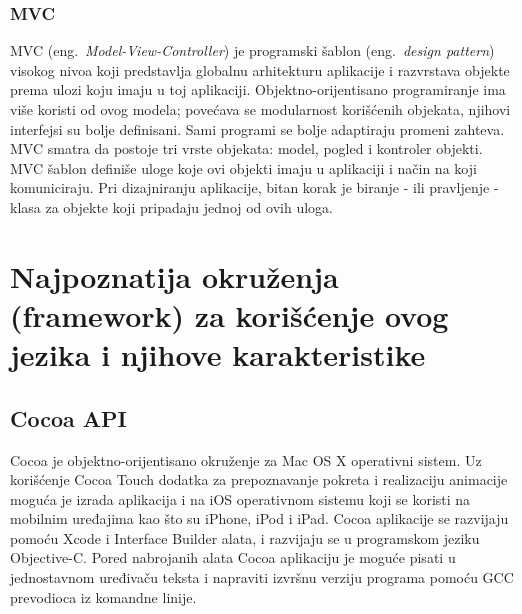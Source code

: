\documentclass[a4paper]{article}
\begin{document}
{\subsubsection{MVC}
MVC (eng.~{\em Model-View-Controller}) je programski šablon (eng.~{\em design pattern}) visokog nivoa koji predstavlja globalnu arhitekturu aplikacije i razvrstava objekte prema ulozi koju imaju u toj aplikaciji.
Objektno-orijentisano programiranje ima više koristi od ovog modela; povećava se modularnost korišćenih objekata, njihovi interfejsi su bolje definisani. Sami programi se bolje adaptiraju promeni zahteva.
MVC smatra da postoje tri vrste objekata: model, pogled i kontroler objekti. MVC šablon definiše uloge koje ovi objekti imaju u aplikaciji i način na koji komuniciraju. Pri dizajniranju aplikacije, bitan korak je biranje - ili pravljenje - klasa za objekte koji pripadaju jednoj od ovih uloga. 
\begin{center}
\end{center}

\section{Najpoznatija okruženja (framework) za korišćenje ovog jezika i njihove karakteristike}
\label{sec:okruzenja}
\subsection{Cocoa API}
\label{sec:Cocoa}
Cocoa \cite{cocoa} je objektno-orijentisano okruženje za Mac OS X operativni sistem. Uz korišćenje Cocoa Touch dodatka za
prepoznavanje pokreta i realizaciju animacije moguća je izrada aplikacija i na iOS operativnom
sistemu koji se koristi na mobilnim uređajima kao što su iPhone, iPod i iPad.
Cocoa aplikacije se
razvijaju pomoću Xcode i Interface Builder alata, i razvijaju se u programskom jeziku Objective-C.
Pored nabrojanih alata Cocoa aplikaciju je moguće pisati u jednostavnom uređivaču teksta i
napraviti izvršnu verziju programa pomoću GCC prevodioca iz komandne linije.

}
\end{document}
